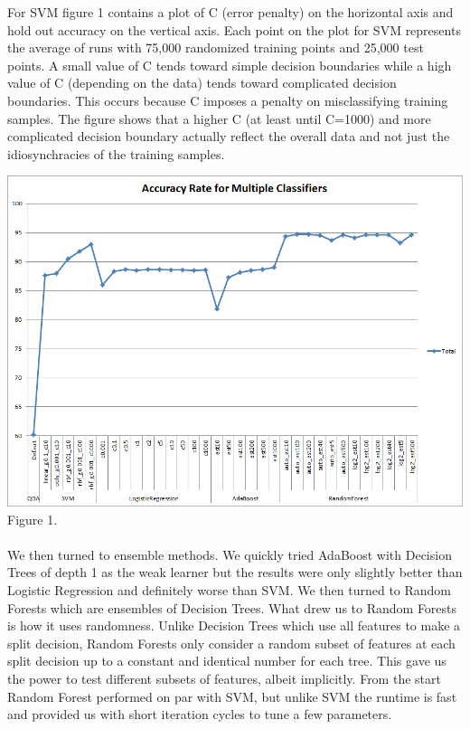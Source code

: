 \documentclass[twoside,11pt]{homework}
\begin{document}
For SVM figure 1 contains a plot of C (error penalty) on the horizontal axis and hold out accuracy on the vertical axis.
Each point on the plot for SVM represents the average of runs with 75,000 randomized training points and 25,000 test points.
A small value of C tends toward simple decision boundaries while a high value of C (depending on the data) tends toward complicated
decision boundaries. This occurs because C imposes a penalty on misclassifying training samples.
The figure shows that a higher C (at least until C=1000) and more complicated decision boundary actually reflect the overall data
and not just the idiosynchracies of the training samples.

\includegraphics[scale=0.5]{classifiers.png}
\\
Figure 1.
\\
\\
We then turned to ensemble methods. We quickly tried AdaBoost with Decision 
Trees of depth 1 as the weak learner but the results were only slightly better than 
Logistic Regression and definitely worse than SVM. We then turned to Random 
Forests which are ensembles of Decision Trees. What drew us to Random Forests is 
how it uses randomness. Unlike Decision Trees which use all features to make a split 
decision, Random Forests only consider a random subset of features at each split decision up to
a constant and identical number for each tree.
This gave us the power to test different subsets of features, albeit implicitly. From the start Random 
Forest performed on par with SVM, but unlike SVM the runtime is fast and provided 
us with short iteration cycles to tune a few parameters. 
\end{document}
